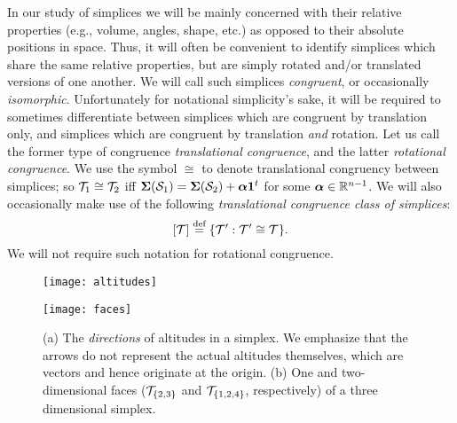 In  our study of simplices we will be mainly concerned with their relative properties (e.g., volume, angles, shape, etc.) as opposed to their absolute  positions in space. Thus, it will often  be convenient to identify simplices which share the same relative properties, but are simply rotated and/or translated versions of one  another. We will call  such simplices \emph{congruent},  or occasionally \emph{isomorphic}. 
Unfortunately for notational simplicity's sake, it will be  required to  sometimes differentiate between simplices  which are congruent by translation only, and simplices which are congruent by translation \emph{and} rotation. Let us  call the former type of congruence \emph{translational congruence},  and  the latter \emph{rotational congruence}. 
We use the symbol $\cong$ to denote translational congruency between simplices; so $\mathcal{T}_1\cong\mathcal{T}_2$ iff $\boldsymbol{\Sigma}(\mathcal{S}_1)=\boldsymbol{\Sigma}(\mathcal{S}_2) + \vb*{\alpha}\vb{1}^t$ for some $\vb*{\alpha}\in\mathbb{R}^{n-1}$. We will also occasionally make use of the following \emph{translational congruence class of simplices}: 
\begin{equation}
\label{eq:[ssplx]}
[\mathcal{T}] \overset{\text{def}}{=} \{\mathcal{T}': \mathcal{T}'\cong\mathcal{T}\}.
\end{equation}
We will not require such notation for rotational congruence. 


\begin{figure}
	\centering
	\begin{minipage}{0.45\textwidth}
		\centering
		\texttt{[image: altitudes]}
		\subcaption{ }
		\label{fig:altitudes}
	\end{minipage}
	\hspace{0.08\textwidth}
	\begin{minipage}{0.45\textwidth}
		\centering
		\texttt{[image: faces]}
		\subcaption{}
		\label{fig:faces}
	\end{minipage}
	\caption{(a) The \emph{directions} of altitudes in a simplex. We emphasize that the arrows do not represent the actual altitudes themselves, which  are  vectors and hence originate at the origin. (b) One and two-dimensional  faces ($\mathcal{T}_{\{2,3\}}$ and $\mathcal{T}_{\{1,2,4\}}$, respectively) of a three dimensional simplex. }
	\label{fig:faces+altitudes}
\end{figure}


